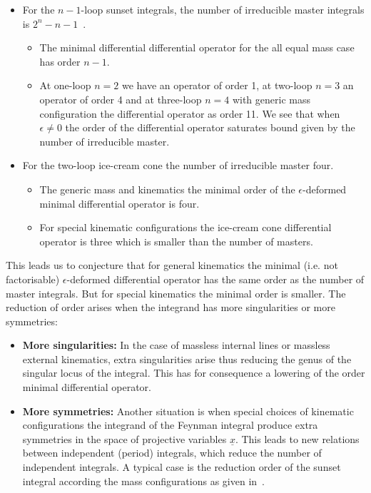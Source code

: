 \documentclass[a4paper,12pt]{article}
\numberwithin{equation}{section}
\numberwithin{figure}{section}
\begin{document}
\begin{itemize}
	\item  For the $n-1$-loop
	sunset integrals, the number of irreducible master integrals 
	is $2^{n}-n-1$~\cite{Kalmykov:2012rr,Bitoun:2017nre}. 
%
%	
	\begin{itemize}  \item The minimal differential differential operator for the all
		equal mass case has order  $n-1$.
		\item At one-loop $n=2$ we have an operator of order 1, at two-loop
		$n=3$ an operator of order 4 and at three-loop $n=4$ with generic
		mass configuration the differential operator
		as   order 11.  We see that when $\epsilon\neq0$  the order of the
		differential operator saturates bound given by the number of
		irreducible master.
	\end{itemize}
	\item For the two-loop ice-cream cone the number of irreducible
          master four.
          \begin{itemize}
            \item The generic mass and kinematics the minimal order of the $\epsilon$-deformed minimal differential
	operator is four.
        \item For special kinematic configurations  the ice-cream cone
          differential operator  is three which is smaller than the
          number of masters.
        \end{itemize}
        \end{itemize}
This leads us to conjecture that 
 for general kinematics the minimal (i.e. not
factorisable) $\epsilon$-deformed differential operator has 
the same order
as the number of master integrals. But for special kinematics the minimal
order is smaller.
%
The reduction of order arises when the integrand has more
singularities or more symmetries:
\begin{itemize}
  \item {\bf More singularities:} In the case of
massless internal lines or massless external kinematics, extra
singularities arise thus reducing the genus of the
singular locus of the integral. This has for  consequence a lowering
of the order  minimal differential operator. 
\item {\bf More symmetries:}
Another situation is when special choices of kinematic
configurations the integrand of the Feynman integral produce extra
symmetries in the space of projective variables $\underline
x$. This leads to new relations between independent (period) integrals, which reduce the number of independent integrals. A typical case is the
reduction order of the sunset integral according the mass
configurations as given in~\cite{Bloch:2014qca,Lairez:2022zkj,Bonisch:2021yfw,Bonisch:2020qmm,Pogel:2022vat}.
\end{itemize}
\end{document}
